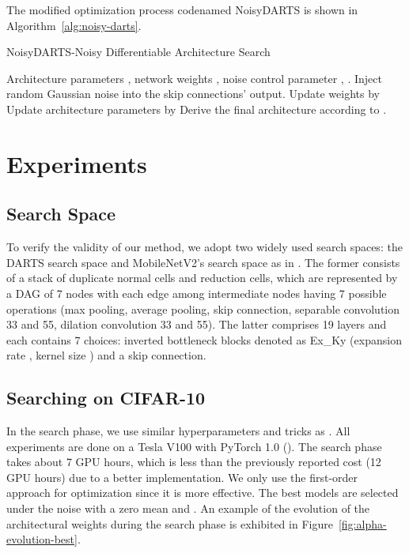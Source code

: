 \documentclass{article}
\newcommand{\citec}[1]{(\cite{#1})}
\begin{document}
The modified optimization process codenamed NoisyDARTS is shown in Algorithm~\ref{alg:noisy-darts}. 

\begin{algorithm}[th]
	\caption{NoisyDARTS-Noisy Differentiable Architecture Search}
	\label{alg:noisy-darts}
	\begin{algorithmic}[1]
		 Architecture parameters , network weights  , noise control parameter , .
		\STATE 		 Inject random Gaussian noise  into the skip connections' output.
		\STATE Update weights  by  
		\STATE Update architecture parameters   by  
		\ENDWHILE
		\STATE Derive the final architecture according to .
	\end{algorithmic}
\end{algorithm}



\section{Experiments}

\subsection{Search Space}
To verify the validity of our method, we adopt two widely used search spaces: the DARTS search space \cite{liu2018darts} and MobileNetV2's search space as in \cite{cai2018proxylessnas}. The former consists of a stack of duplicate normal cells and reduction cells, which are represented by a DAG of 7 nodes with each edge among intermediate nodes having 7 possible operations (max pooling, average pooling, skip connection, separable convolution 33 and 55, dilation convolution 33 and 55). The latter comprises 19 layers and each contains 7 choices: inverted bottleneck blocks denoted as Ex\_Ky (expansion rate , kernel size ) and a skip connection. 

\subsection{Searching on CIFAR-10}
In the search phase, we use similar hyperparameters and tricks as \cite{liu2018darts}. All experiments are done on a Tesla V100 with PyTorch 1.0 \citec{paszke2019pytorch}. The search phase takes about 7 GPU hours, which is less than the previously reported cost (12 GPU hours) due to a better implementation. We only use the first-order approach for optimization since it is more effective. The best models are selected under the noise with a zero mean and . An example of the evolution of the architectural weights during the search phase is exhibited in Figure~\ref{fig:alpha-evolution-best}.
\end{document}
